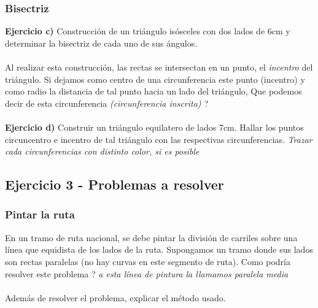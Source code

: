 \documentclass[11pt, a4paper]{article}
\begin{document}
\subsubsection*{Bisectriz}

\textbf{ Ejercicio c) } Construcci\'on de un tri\'angulo is\'osceles con dos lados de 6cm y determinar la bisectriz de cada uno de sus \'angulos. \\ \\ 
Al realizar esta construcci\'on, las rectas se intersectan en un punto, el \textit{{\color{blue}incentro}} del tri\'angulo. Si dejamos como centro de una circunferencia este punto (incentro) y como radio la distancia de tal punto  hacia un lado del tri\'angulo, Que podemos decir de esta circunferencia \textit{ {\color{blue} (circunferencia inscrita) } } ? \\ \\
\textbf{ Ejercicio d) } Construir un tri\'angulo equilatero de lados 7cm. Hallar los puntos circuncentro e incentro de tal tri\'angulo con las respectivas circunferencias. \textit{Trazar cada circunferencias con distinto color, si es posible}



\subsection*{ Ejercicio 3 - Problemas a resolver }

\subsubsection*{ Pintar la ruta }

En un tramo de ruta nacional, se debe pintar la divisi\'on de carriles sobre una l\'inea que equidista de los lados de la ruta. Supongamos un tramo donde sus lados son rectas paralelas (no hay curvas en este segmento de ruta). Como podr\'ia resolver este problema ? \textit{ a esta l\'inea de pintura la llamamos {\color{blue} paralela media} } \\ \\
Adem\'as de resolver el problema, explicar el m\'etodo usado. 
\end{document}
